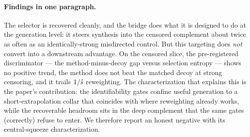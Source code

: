 \paragraph{Findings in one paragraph.} The selector is recovered cleanly, and
the bridge does what it is designed to do at the generation level: it steers
synthesis into the censored complement about twice as often as an
identically-strong misdirected control. But this targeting does \emph{not}
convert into a downstream advantage. On the censored slice, the pre-registered
discriminator --- the method-minus-decoy gap versus selection entropy --- shows
no positive trend, the method does not beat the matched decoy at strong
censoring, and it trails $1/\hat s$ reweighting. The characterization that
explains this is the paper's contribution: the identifiability gates confine
useful generation to a short-extrapolation collar that coincides with where
reweighting already works, while the recoverable headroom sits in the deep
complement that the same gates (correctly) refuse to enter. We therefore report
an honest negative with its central-squeeze characterization.
